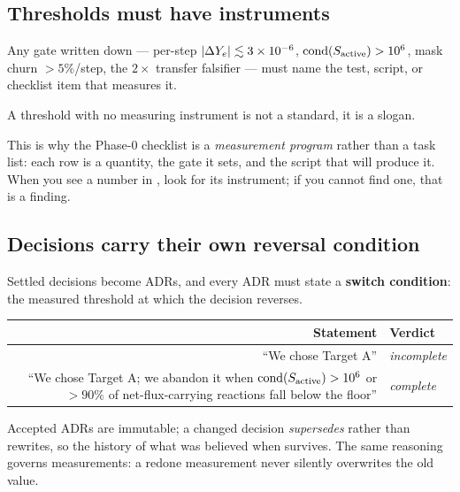 \subsection{Thresholds must have instruments}
\label{sec:instruments}

Any gate written down --- per-step $|\Delta Y_{e}| \lesssim 3\times10^{-6}$,
$\operatorname{cond}(S_{\mathrm{active}}) > 10^{6}$, mask churn $> 5\%$/step, the $2\times$
transfer falsifier --- must name the test, script, or checklist item that
measures it.

\begin{invariant}
A threshold with no measuring instrument is not a standard, it is a slogan.
\end{invariant}

This is why the Phase-0 checklist is a \emph{measurement program} rather than a
task list: each row is a quantity, the gate it sets, and the script that will
produce it. When you see a number in , look for its instrument;
if you cannot find one, that is a finding.

\subsection{Decisions carry their own reversal condition}
\label{sec:switchconditions}

Settled decisions become ADRs, and every ADR must state a \textbf{switch
condition}: the measured threshold at which the decision reverses.

\begin{center}
\small
\begin{tabularx}{\textwidth}{@{}R{1.000} l@{}}
\toprule
\textbf{Statement} & \textbf{Verdict} \\
\midrule
``We chose Target A'' & \emph{incomplete} \\
``We chose Target A; we abandon it when
  $\operatorname{cond}(S_{\mathrm{active}}) > 10^{6}$ or $>90\%$ of net-flux-carrying
  reactions fall below the \Ye{} floor'' & \emph{complete} \\
\bottomrule
\end{tabularx}
\end{center}

Accepted ADRs are immutable; a changed decision \emph{supersedes} rather than
rewrites, so the history of what was believed when survives. The same reasoning
governs measurements: a redone measurement never silently overwrites the old
value.

